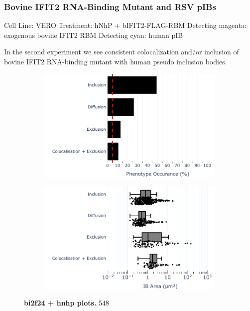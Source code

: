 \subsubsection{Bovine IFIT2 RNA-Binding Mutant and RSV pIBs} \label{Bovine IFIT2 RNA-Binding Mutant and RSV pIBs}
Cell Line: VERO
Treatment: hNhP + bIFIT2-FLAG-RBM
Detecting magenta: exogenous bovine IFIT2 RBM
Detecting cyan: human pIB

In the second experiment we see consistent colocalization and/or inclusion of bovine IFIT2 RNA-binding mutant with human pseudo inclusion bodies.

\begin{figure}
    \begin{subfigure}{0.495\textwidth}
        \caption{}
        \includegraphics[width=1\linewidth]{10. Chapter 5/Figs/04. IFIT2-RNA binding mutant/02. pIB/01. bar_bi2f24_hnhp.pdf} 
    \end{subfigure}
    \begin{subfigure}{0.495\textwidth}
        \caption{}
        \includegraphics[width=1\linewidth]{10. Chapter 5/Figs/04. IFIT2-RNA binding mutant/02. pIB/02. box_bi2f24_hnhp.pdf}
    \end{subfigure}
    \caption[bi2f24 + hnhp plots]{\textbf{bi2f24 + hnhp plots.} 548}
    \label{fig:bi2f24 + hnhp plots}
\end{figure}

